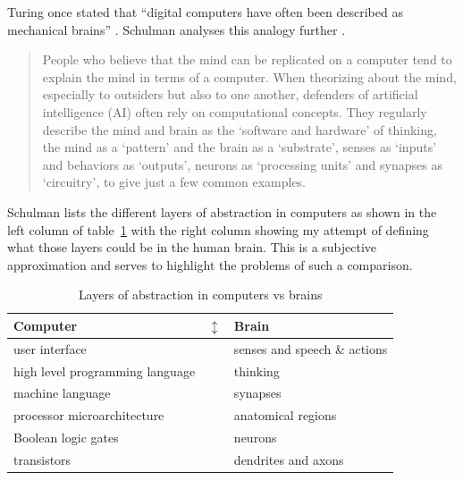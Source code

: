Turing once stated that ``digital computers have often been described as mechanical brains'' \autocite*{Turing1951}. Schulman analyses this analogy further \autocite*{Schulman2009}.

\begin{quotation}
  People who believe that the mind can be replicated on a computer tend to explain the mind in terms of a computer. When theorizing about the mind, especially to outsiders but also to one another, defenders of artificial intelligence (AI) often rely on computational concepts. They regularly describe the mind and brain as the `software and hardware' of thinking, the mind as a `pattern' and the brain as a `substrate', senses as `inputs' and behaviors as `outputs', neurons as `processing units' and synapses as `circuitry', to give just a few common examples. 
\end{quotation}




Schulman lists the different layers of abstraction in computers as shown in the left column of table~\ref{tab:abstr} with the right column showing my attempt of defining what those layers could be in the human brain. This is a subjective approximation and serves to highlight the problems of such a comparison.

\begin{table}[!htbp]
\centering
\caption{Layers of abstraction in computers vs brains}
\label{tab:abstr}
  \begin{tabular}{@{}lcl@{}}
  \toprule
  \textbf{Computer} & \multirow{6}{*}{$\updownarrow$} & \textbf{Brain} \\ 
  \midrule
  user interface                  &  & senses and speech \& actions \\
  high level programming language &  & thinking            \\
  machine language                &  & synapses            \\
  processor microarchitecture     &  & anatomical regions  \\
  Boolean logic gates             &  & neurons             \\
  transistors                     &  & dendrites and axons \\ 
  \bottomrule
  \end{tabular}
\end{table}

